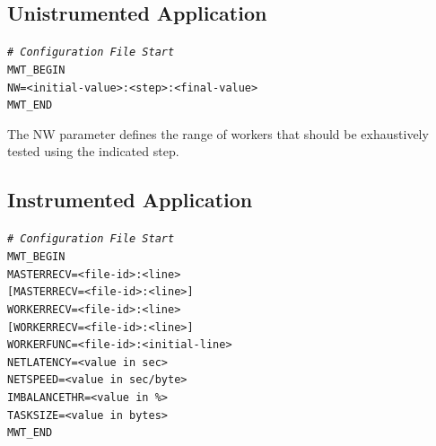 \documentclass[11pt,a4paper, oneside]{book} %
\newenvironment{code}%
{
\addtolength{\leftskip}{0.5cm}}%
{

}
\begin{document}
\subsection{Unistrumented Application}

\begin{code}
\texttt{\textit{\# Configuration File Start}} \\
\texttt{MWT\_BEGIN} \\
\texttt{NW=<initial-value>:<step>:<final-value>} \\
\texttt{MWT\_END} \\
\end{code}

The NW parameter defines the range of workers that should be exhaustively
tested using the indicated step.

\subsection{Instrumented Application}

\begin{code}
\texttt{\textit{\# Configuration File Start}} \\
\texttt{MWT\_BEGIN} \\
\texttt{MASTERRECV=<file-id>:<line>} \\
\texttt{[MASTERRECV=<file-id>:<line>]} \\
\texttt{WORKERRECV=<file-id>:<line>} \\
\texttt{[WORKERRECV=<file-id>:<line>]} \\
\texttt{WORKERFUNC=<file-id>:<initial-line>} \\
\texttt{NETLATENCY=<value in sec>} \\
\texttt{NETSPEED=<value in sec/byte>} \\
\texttt{IMBALANCETHR=<value in \%>} \\
\texttt{TASKSIZE=<value in bytes>} \\
\texttt{MWT\_END} \\
\end{code}
\end{document}
